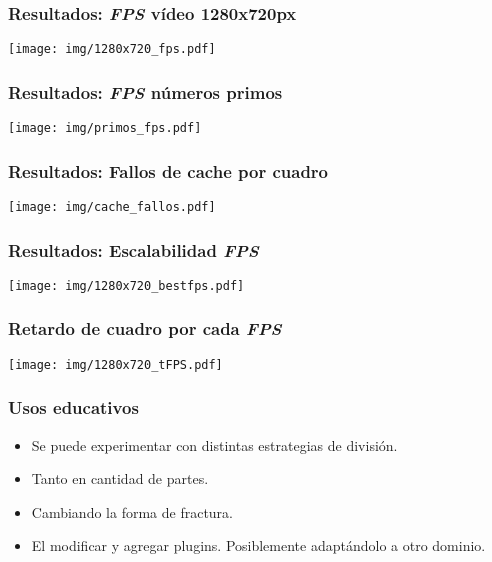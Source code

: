 \documentclass[11pt,a4paper,spanish]{beamer}
\begin{document}
\begin{frame}

\frametitle{Resultados: \emph{FPS} vídeo 1280x720px}

\texttt{[image: img/1280x720\_fps.pdf]}

\end{frame}

\begin{frame}

\frametitle{Resultados: \emph{FPS} números primos}

\texttt{[image: img/primos\_fps.pdf]}

\end{frame}

\begin{frame}

\frametitle{Resultados: Fallos de cache por cuadro}

\texttt{[image: img/cache\_fallos.pdf]}

\end{frame}

\begin{frame}

\frametitle{Resultados: Escalabilidad \emph{FPS}}

\texttt{[image: img/1280x720\_bestfps.pdf]}

\end{frame}

\begin{frame}

\frametitle{Retardo de cuadro por cada \emph{FPS}}

\texttt{[image: img/1280x720\_tFPS.pdf]}

\end{frame}

\begin{frame}

\frametitle{Usos educativos}


\begin{itemize}
	
	\item Se puede experimentar con distintas estrategias de división.

	\item Tanto en cantidad de partes.

	\item Cambiando la forma de fractura.

	\item El modificar y agregar plugins. Posiblemente adaptándolo a otro
		dominio.
	
\end{itemize}

\end{frame}
\end{document}
